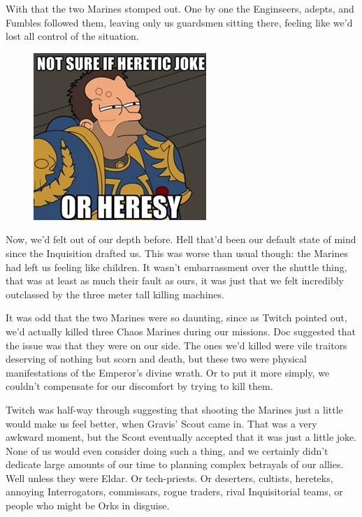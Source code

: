 With that the two Marines stomped out. 
One by one the Enginseers, adepts, and Fumbles followed them, leaving only us guardsmen sitting there, feeling like we'd lost all control of the situation.
\begin{figure}
	\begin{center}
		\includegraphics[width=\figwidth]{pics/12/23.png}
	\end{center}
\end{figure}
Now, we'd felt out of our depth before. 
Hell that'd been our default state of mind since the Inquisition drafted us. 
This was worse than usual though: 
the Marines had left us feeling like children. 
It wasn't embarrassment over the shuttle thing, that was at least as much their fault as ours, it was just that we felt incredibly outclassed by the three meter tall killing machines.

It was odd that the two Marines were so daunting, since as Twitch pointed out, we'd actually killed three Chaos Marines during our missions. 
Doc suggested that the issue was that they were on our side. 
The ones we'd killed were vile traitors deserving of nothing but scorn and death, but these two were physical manifestations of the Emperor's divine wrath. 
Or to put it more simply, we couldn't compensate for our discomfort by trying to kill them.

Twitch was half-way through suggesting that shooting the Marines just a little would make us feel better, when Gravis' Scout came in. 
That was a very awkward moment, but the Scout eventually accepted that it was just a little joke. 
None of us would even consider doing such a thing, and we certainly didn't dedicate large amounts of our time to planning complex betrayals of our allies. 
Well unless they were Eldar. 
Or tech-priests. 
Or deserters, cultists, hereteks, annoying Interrogators, commissars, rogue traders, rival Inquisitorial teams, or people who might be Orks in disguise. 


